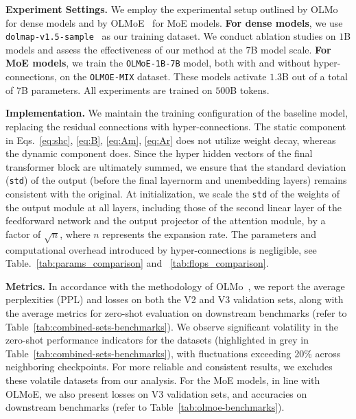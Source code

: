 \documentclass{article} %
\newcommand{\newtext}[1]{\textcolor{red}{#1}}
\renewcommand{\newtext}[1]{#1}
\begin{document}
\textbf{Experiment Settings.} We employ the experimental setup outlined by OLMo~\citep{groeneveld2024olmo} for dense models and by OLMoE~\citep{muennighoff2024olmoeopenmixtureofexpertslanguage} for MoE models. \textbf{For dense models}, we use \texttt{dolmap-v1.5-sample}~\citep{soldaini2024dolma} as our training dataset. We conduct ablation studies on $1$B models and assess the effectiveness of our method at the $7$B model scale. \textbf{For MoE models}, we train the \texttt{OLMoE-1B-7B} model, both with and without hyper-connections, on the \texttt{OLMOE-MIX} dataset. These models activate $1.3$B out of a total of $7$B parameters. All experiments are trained on $500$B tokens.

\textbf{Implementation.} We maintain the training configuration of the baseline model, replacing the residual connections with hyper-connections. The static component in Eqs.~\ref{eq:shc}, \ref{eq:B}, \ref{eq:Am}, \ref{eq:Ar} does not utilize weight decay, whereas the dynamic component does. Since the hyper hidden vectors of the final transformer block are ultimately summed, we ensure that the standard deviation (\texttt{std}) of the output (before the final layernorm and unembedding layers) remains consistent with the original. At initialization, we scale the \texttt{std} of the weights of the output module at all layers, including those of the second linear layer of the feedforward network and the output projector of the attention module, by a factor of $\sqrt{n}$, where $n$ represents the expansion rate. \newtext{The parameters and computational overhead introduced by hyper-connections is negligible, see Table.~\ref{tab:params_comparison} and ~\ref{tab:flops_comparison}.}

\textbf{Metrics.} In accordance with the methodology of OLMo~\citep{groeneveld2024olmo}, we report the average perplexities (PPL) and losses on both the V2 and V3 validation sets, along with the average metrics for zero-shot evaluation on downstream benchmarks (refer to Table~\ref{tab:combined-sets-benchmarks}). We observe significant volatility in the zero-shot performance indicators for the datasets (highlighted in grey in Table~\ref{tab:combined-sets-benchmarks}), with fluctuations exceeding 20\% across neighboring checkpoints. For more reliable and consistent results, we excludes these volatile datasets from our analysis. For the MoE models, in line with OLMoE, we also present  losses on V3 validation sets, and accuracies on downstream benchmarks (refer to Table~\ref{tab:olmoe-benchmarks}).
\end{document}
